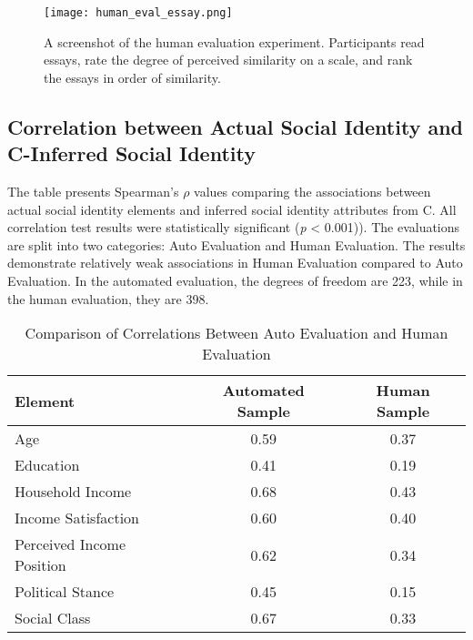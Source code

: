 \begin{figure*}
    \centering
    \texttt{[image: human\_eval\_essay.png]}
    \caption{A screenshot of the human evaluation experiment. Participants read essays, rate the degree of perceived similarity on a scale, and rank the essays in order of similarity.}
    \label{fig:screenshot_experiment}
\end{figure*}


\subsection{Correlation between Actual Social Identity and C-Inferred Social Identity}
\label{sec:appendix_human_eval_inference_comparison}
The table presents Spearman's $\rho$ values comparing the associations between actual social identity elements and inferred social identity attributes from C. All correlation test results were statistically significant (\textit{p} < 0.001)). The evaluations are split into two categories: Auto Evaluation and Human Evaluation. The results demonstrate relatively weak associations in Human Evaluation compared to Auto Evaluation. In the automated evaluation, the degrees of freedom are 223, while in the human evaluation, they are 398.

\begin{table}[ht]
\centering
\label{tab:evaluation_comparison}
\begin{adjustbox}{width=\textwidth}
\begin{tabular}{lcc}
\toprule
\textbf{Element} & \textbf{Automated Sample} & \textbf{Human Sample} \\
\midrule
Age & 0.59 & 0.37 \\
Education & 0.41 & 0.19 \\
Household Income & 0.68 & 0.43 \\
Income Satisfaction & 0.60 & 0.40 \\
Perceived Income Position & 0.62 & 0.34 \\
Political Stance & 0.45 & 0.15 \\
Social Class & 0.67 & 0.33 \\
\bottomrule
\end{tabular}
\end{adjustbox}
\caption{Comparison of Correlations Between Auto Evaluation and Human Evaluation}
\end{table}